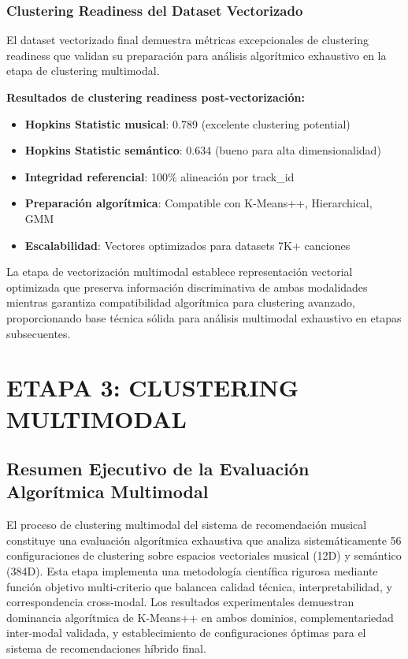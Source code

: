 \documentclass[12pt,a4paper]{report}
\begin{document}
\subsection{Clustering Readiness del Dataset Vectorizado}

El dataset vectorizado final demuestra métricas excepcionales de clustering readiness que validan su preparación para análisis algorítmico exhaustivo en la etapa de clustering multimodal.

\textbf{Resultados de clustering readiness post-vectorización:}
\begin{itemize}
    \item \textbf{Hopkins Statistic musical}: 0.789 (excelente clustering potential)
    \item \textbf{Hopkins Statistic semántico}: 0.634 (bueno para alta dimensionalidad)
    \item \textbf{Integridad referencial}: 100\% alineación por track\_id
    \item \textbf{Preparación algorítmica}: Compatible con K-Means++, Hierarchical, GMM
    \item \textbf{Escalabilidad}: Vectores optimizados para datasets 7K+ canciones
\end{itemize}

La etapa de vectorización multimodal establece representación vectorial optimizada que preserva información discriminativa de ambas modalidades mientras garantiza compatibilidad algorítmica para clustering avanzado, proporcionando base técnica sólida para análisis multimodal exhaustivo en etapas subsecuentes.

\chapter{ETAPA 3: CLUSTERING MULTIMODAL}
\label{chap:clustering}

\section{Resumen Ejecutivo de la Evaluación Algorítmica Multimodal}

El proceso de clustering multimodal del sistema de recomendación musical constituye una evaluación algorítmica exhaustiva que analiza sistemáticamente 56 configuraciones de clustering sobre espacios vectoriales musical (12D) y semántico (384D). Esta etapa implementa una metodología científica rigurosa mediante función objetivo multi-criterio que balancea calidad técnica, interpretabilidad, y correspondencia cross-modal. Los resultados experimentales demuestran dominancia algorítmica de K-Means++ en ambos dominios, complementariedad inter-modal validada, y establecimiento de configuraciones óptimas para el sistema de recomendaciones híbrido final.
\end{document}
